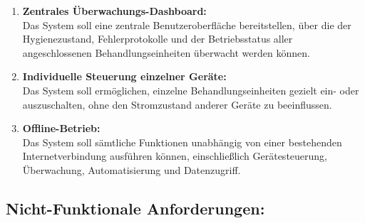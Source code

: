 \begin{enumerate}
    \item \textbf{Zentrales Überwachungs-Dashboard:} \\
    Das System soll eine zentrale Benutzeroberfläche bereitstellen, über die der Hygienezustand, Fehlerprotokolle und der Betriebsstatus aller angeschlossenen Behandlungseinheiten überwacht werden können.\\

    \item \textbf{Individuelle Steuerung einzelner Geräte:} \\
    Das System soll ermöglichen, einzelne Behandlungseinheiten gezielt ein- oder auszuschalten, ohne den Stromzustand anderer Geräte zu beeinflussen.\\

    \item \textbf{Offline-Betrieb:} \\
    Das System soll sämtliche Funktionen unabhängig von einer bestehenden Internetverbindung ausführen können, einschließlich Gerätesteuerung, Überwachung, Automatisierung und Datenzugriff.
\end{enumerate}

\subsection{Nicht-Funktionale Anforderungen:}

